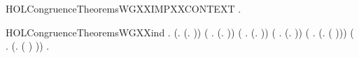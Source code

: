 \newcommand{\HOLCongruenceTheoremsWGXXCONST}{\UseVerbatim{HOLCongruenceTheoremsWGXXCONST}}
\begin{SaveVerbatim}{HOLCongruenceTheoremsWGXXIMPXXCONTEXT}
\HOLTokenTurnstile{} \HOLSymConst{\HOLTokenForall{}}.   \HOLSymConst{\HOLTokenImp{}}  
\end{SaveVerbatim}
\newcommand{\HOLCongruenceTheoremsWGXXIMPXXCONTEXT}{\UseVerbatim{HOLCongruenceTheoremsWGXXIMPXXCONTEXT}}
\begin{SaveVerbatim}{HOLCongruenceTheoremsWGXXind}
\HOLTokenTurnstile{} \HOLSymConst{\HOLTokenForall{}}.
       (\HOLSymConst{\HOLTokenForall{}}.  (\HOLTokenLambda{}. )) \HOLSymConst{\HOLTokenConj{}}
       (\HOLSymConst{\HOLTokenForall{}} .   \HOLSymConst{\HOLTokenImp{}}  (\HOLTokenLambda{}.  )) \HOLSymConst{\HOLTokenConj{}}
       (\HOLSymConst{\HOLTokenForall{}} .   \HOLSymConst{\HOLTokenConj{}}   \HOLSymConst{\HOLTokenImp{}}  (\HOLTokenLambda{}.   \HOLSymConst{\ensuremath{+}}  )) \HOLSymConst{\HOLTokenConj{}}
       (\HOLSymConst{\HOLTokenForall{}} .   \HOLSymConst{\HOLTokenConj{}}   \HOLSymConst{\HOLTokenImp{}}  (\HOLTokenLambda{}.   \HOLSymConst{\ensuremath{\parallel}}  )) \HOLSymConst{\HOLTokenConj{}}
       (\HOLSymConst{\HOLTokenForall{}} .   \HOLSymConst{\HOLTokenImp{}}  (\HOLTokenLambda{}. \HOLConst{\ensuremath{\nu}}  ( ))) \HOLSymConst{\HOLTokenConj{}}
       (\HOLSymConst{\HOLTokenForall{}} .   \HOLSymConst{\HOLTokenImp{}}  (\HOLTokenLambda{}.  ( ) )) \HOLSymConst{\HOLTokenImp{}}
       \HOLSymConst{\HOLTokenForall{}}.   \HOLSymConst{\HOLTokenImp{}}  
\end{SaveVerbatim}
